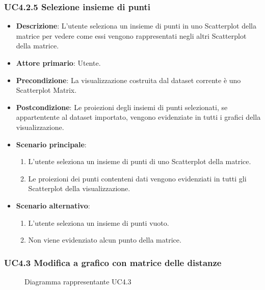 \subsubsection{UC4.2.5 Selezione insieme di punti}
\label{ssub:uc4.2.5}
\begin{itemize}
    \item \textbf{Descrizione}: L'utente seleziona un insieme di punti in uno Scatterplot della matrice per vedere come 
                                essi vengono rappresentati negli altri Scatterplot della matrice.
	
    \item \textbf{Attore primario}: Utente.
    
    \item \textbf{Precondizione}:   La visualizzazione costruita dal dataset corrente è uno Scatterplot Matrix.
    \item \textbf{Postcondizione}:  Le proiezioni degli insiemi di punti selezionati, se appartentente al dataset importato, 
                                    vengono evidenziate in tutti i grafici della visualizzazione.

	\item \textbf{Scenario principale}:
        \begin{enumerate}
            \item L'utente seleziona un insieme di punti di uno Scatterplot della matrice.
            \item Le proiezioni dei punti contenteni dati vengono evidenziati in tutti gli Scatterplot della visualizzazione.
        \end{enumerate}

    \item \textbf{Scenario alternativo}:
        \begin{enumerate}
            \item L'utente seleziona un insieme di punti vuoto.
            \item Non viene evidenziato alcun punto della matrice.
        \end{enumerate}

\end{itemize}

\newpage
\subsubsection{UC4.3 Modifica a grafico con matrice delle distanze}
\label{ssub:uc4.3}

\begin{figure}[h]
    \centering
    \caption{Diagramma rappresentante UC4.3}
    \label{fig:UC4.3}
\end{figure}

